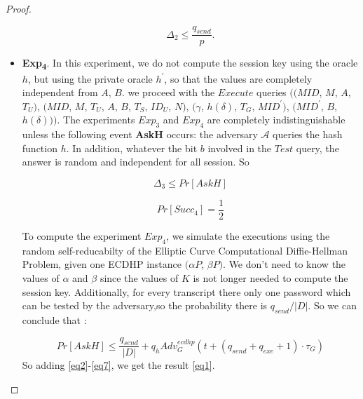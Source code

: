 \documentclass[a4paper,12pt]{report}
\begin{document}
\begin{proof}
\begin{itemize}
\begin{equation}\label{eq5}
\Delta_2 \leq \frac{q_{send}}{p}.
\end{equation}

\item \textbf{Exp\textsubscript{4}}. In this experiment, we do not
compute the session key using the oracle $h$, but using the private
oracle $h^{\prime}$, so that the values are completely independent
from $A$, $B$. we proceed with the $Execute$ queries $((MID$, $M$,
$A$, $T_U)$, $(MID$, $M$, $T_U$, $A$, $B$, $T_S$, $ID_U$, $N)$,
$(\gamma$, $h(\delta)$, $T_G$, $MID^{\prime})$, $(MID^{\prime}$,
$B$, $h(\delta)))$. The experiments $Exp_3$ and $Exp_4$ are
completely indistinguishable unless the following event
\textbf{AskH} occurs: the adversary $\mathcal{A}$ queries the hash
function $h$. In addition, whatever the bit $b$ involved in the
$Test$ query, the answer is random and independent for all session.
So

\begin{equation}\label{eq6}
\Delta_3 \leq Pr[AskH]
\end{equation}

\begin{equation}\label{eq7}
Pr[Succ_4] = \frac{1}{2}
\end{equation}

To compute the experiment $Exp_4$, we simulate the executions using
the random self-reducabilty of the Elliptic Curve Computational
Diffie-Hellman Problem, given one ECDHP instance $(\alpha P$, $\beta
P)$. We don't need to know the values of $\alpha$ and $\beta$ since
the values of $K$ is not longer needed to compute the session key.
Additionally, for every transcript there only one password which can
be tested by the adversary,so the probability there is
$q_{send}/|D|$. So we can conclude that :

$$Pr[AskH] \leq \frac{q_{send}}{|D|} + q_h Adv_G^{ecdhp}(t+(q_{send}+q_{exe}+1)\cdot \tau_{G})$$
So adding \ref{eq2}-\ref{eq7}, we get the result \ref{eq1}.
\end{itemize}
\end{proof}
\end{document}
